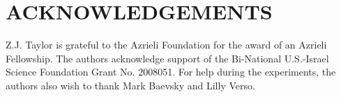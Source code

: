 \documentclass{piv13-abstract}
\begin{document}
\section*{ACKNOWLEDGEMENTS}

Z.J. Taylor is grateful to the Azrieli Foundation for the award of an Azrieli Fellowship. The authors acknowledge support of the  Bi-National U.S.-Israel Science Foundation Grant No. 2008051. For help during the experiments, the authors also wish to thank Mark Baevsky and Lilly Verso.

%
%

\end{document}
